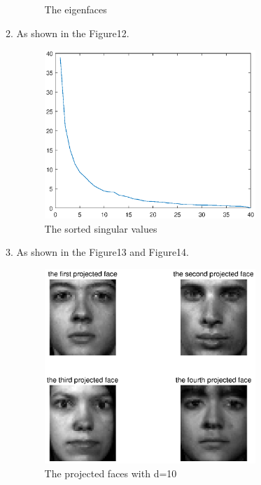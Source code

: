 \documentclass[english,onecolumn]{IEEEtran}
\begin{document}
\begin{enumerate}
\begin{enumerate}
\begin{figure}[htbp]
						\caption{The eigenfaces}
			\end{figure}
		\item
		As shown in the Figure12.\\
		\begin{figure}[htbp]
						\centering
						\includegraphics[width=0.8\textwidth]{fig4_2_b.eps}
						\caption{The sorted singular values}
		\end{figure}
		\item
		As shown in the Figure13 and Figure14.\\
		\begin{figure}[htbp]
						\centering
						\includegraphics[width=0.8\textwidth]{fig4_2_c_1.eps}
						\caption{The projected faces with d=10}
			\end{figure}
			\begin{figure}[htbp]
						\centering

\end{figure}
\end{enumerate}
\end{enumerate}
\end{document}
